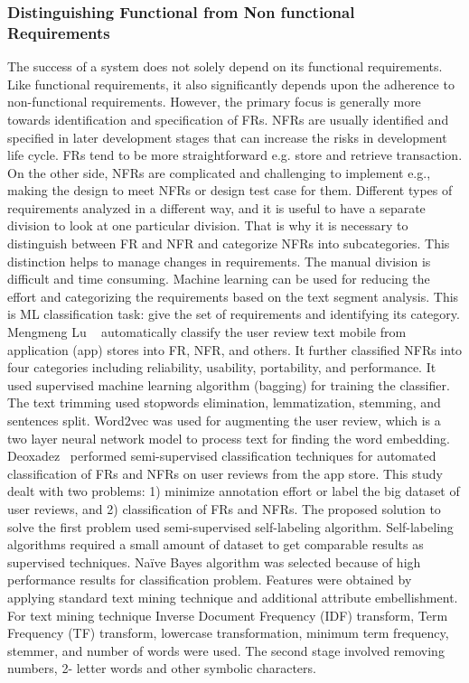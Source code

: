 \subsubsection{Distinguishing Functional from Non functional Requirements}

The success of a system does not solely depend on its functional requirements.
Like functional requirements, it also significantly depends upon the adherence
to non-functional requirements. However, the primary focus is generally more
towards identification and specification of FRs. NFRs are usually identified and
specified in later development stages that can increase the risks in development
life cycle. FRs tend to be more straightforward e.g. store and retrieve
transaction. On the other side, NFRs are complicated and challenging to
implement e.g., making the design to meet NFRs or design test case for them.
Different types of requirements analyzed in a different way, and it is useful to
have a separate division to look at one particular division. That is why it is
necessary to distinguish between FR and NFR and categorize NFRs into
subcategories. This distinction helps to manage changes in requirements. The
manual division is difficult and time consuming. Machine learning can be used
for reducing the effort and categorizing the requirements based on the text
segment analysis. This is ML classification task: give the set of requirements
and identifying its category.\\

	Mengmeng Lu \etal~ \cite{Lu:2017} automatically classify the user review text
mobile from application (app) stores  into FR, NFR, and others. It further
classified NFRs into four categories including reliability, usability,
portability, and performance. It used supervised machine learning algorithm
(bagging) for training the classifier. The text trimming used stopwords
elimination, lemmatization, stemming, and sentences split. Word2vec was used for augmenting the user review, 
which is a two layer neural network model to process text for finding the word embedding.\\

	Deoxadez \etal~\cite{Deocadez:2017}performed semi-supervised classification techniques
for automated classification of FRs and NFRs on user reviews from the app store.
This study dealt with two problems: 1) minimize annotation effort or label the
big dataset of user reviews, and 2) classification of FRs and NFRs. The proposed
solution to solve the first problem used semi-supervised self-labeling
algorithm. Self-labeling algorithms required a small amount of dataset to get
comparable results as supervised techniques. Naïve Bayes algorithm was selected
because of high performance results for classification problem. Features were
obtained by applying standard text mining technique and additional attribute
embellishment. For text mining technique Inverse Document Frequency (IDF) transform, Term Frequency (TF) transform, lowercase
transformation, minimum term frequency, stemmer, and number of words were used. The second stage involved removing numbers, 2- letter words
and other symbolic characters.\\


